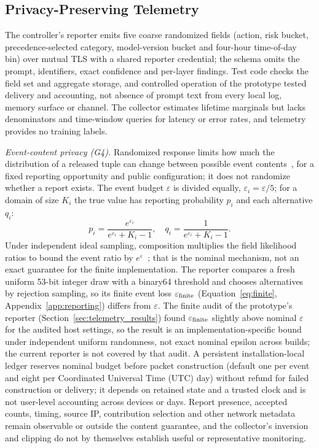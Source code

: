 \documentclass[sigconf]{acmart}
\theoremstyle{acmdefinition}\newtheorem{property}{Property}
\newcommand{\pendingStageThirteen}[1]{#1}
\begin{document}
\subsection{Privacy-Preserving Telemetry}
\label{sec:telemetry_mechanism}
The controller's reporter emits five coarse randomized fields (action, risk bucket, precedence-selected category, model-version bucket and four-hour time-of-day bin) over mutual TLS with a shared reporter credential; the schema omits the prompt, identifiers, exact confidence and per-layer findings. Test code checks the field set and aggregate storage, and controlled operation of the prototype tested delivery and accounting, not absence of prompt text from every local log, memory surface or channel. The collector estimates lifetime marginals but lacks denominators and time-window queries for latency or error rates, and telemetry provides no training labels.

\textit{Event-content privacy (G4).} Randomized response limits how much the distribution of a released tuple can change between possible event contents~\cite{DworkRothFoundations2014}, for a fixed reporting opportunity and public configuration; it does not randomize whether a report exists. The event budget $\varepsilon$ is divided equally, $\varepsilon_i=\varepsilon/5$; for a domain of size $K_i$ the true value has reporting probability $p_i$ and each alternative $q_i$:
\begin{equation}
p_i=\frac{e^{\varepsilon_i}}{e^{\varepsilon_i}+K_i-1},\quad
q_i=\frac{1}{e^{\varepsilon_i}+K_i-1}.
\end{equation}
Under independent ideal sampling, composition multiplies the field likelihood ratios to bound the event ratio by $e^\varepsilon$~\cite{DworkRothFoundations2014}; that is the nominal mechanism, not an exact guarantee for the finite implementation. The reporter compares a fresh uniform 53-bit integer draw with a binary64 threshold and chooses alternatives by rejection sampling, so its finite event loss $\varepsilon_{\rm finite}$ (Equation~\ref{eq:finite}, Appendix~\ref{app:reporting}) differs from $\varepsilon$. The finite audit of the prototype's reporter (Section~\ref{sec:telemetry_results}) found $\varepsilon_{\rm finite}$ slightly above nominal $\varepsilon$ for the audited host settings, so the result is an implementation-specific bound under independent uniform randomness, not exact nominal epsilon across builds; \pendingStageThirteen{the current reporter is not covered by that audit}. A persistent installation-local ledger reserves nominal budget before packet construction (default one per event and eight per Coordinated Universal Time (UTC) day) without refund for failed construction or delivery; it depends on retained state and a trusted clock and is not user-level accounting across devices or days. Report presence, accepted counts, timing, source IP, contribution selection and other network metadata remain observable or outside the content guarantee, and the collector's inversion and clipping do not by themselves establish useful or representative monitoring.
\end{document}
